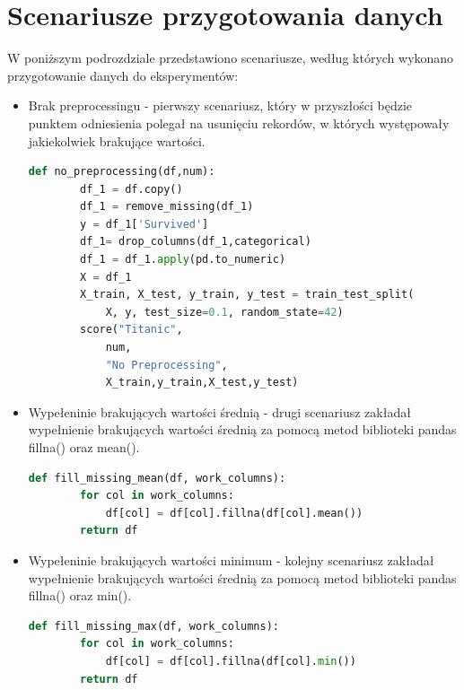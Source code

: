 \documentclass[oneside]{book}
\begin{document}
\section{Scenariusze przygotowania danych}
W poniższym podrozdziale przedstawiono scenariusze, 
według których wykonano przygotowanie danych do eksperymentów:

\begin{itemize}
\item Brak preprocessingu - pierwszy scenariusz, który w przyszłości 
będzie punktem odniesienia polegał na usunięciu rekordów, 
w których występowały jakiekolwiek brakujące wartości. 

\begin{lstlisting}[language=Python, caption={Brak przygotowania
     danych dla zbioru danych Titanic}, captionpos=b]
    def no_preprocessing(df,num):
        df_1 = df.copy()
        df_1 = remove_missing(df_1)
        y = df_1['Survived']
        df_1= drop_columns(df_1,categorical)
        df_1 = df_1.apply(pd.to_numeric)
        X = df_1
        X_train, X_test, y_train, y_test = train_test_split(
            X, y, test_size=0.1, random_state=42)
        score("Titanic",
            num,
            "No Preprocessing",
            X_train,y_train,X_test,y_test)
    \end{lstlisting}

\item Wypełeninie brakujących wartości średnią -
drugi scenariusz zakładał wypełnienie brakujących 
wartości średnią za pomocą metod biblioteki pandas 
fillna() oraz mean().

\begin{lstlisting}[language=Python, caption={Wypełnienie 
    brakujących wartości średnią}, captionpos=b]
    def fill_missing_mean(df, work_columns):
        for col in work_columns:
            df[col] = df[col].fillna(df[col].mean())
        return df
\end{lstlisting}

\item Wypełeninie brakujących wartości minimum -
kolejny scenariusz zakładał wypełnienie brakujących 
wartości średnią za pomocą metod biblioteki pandas fillna() 
oraz min().

\begin{lstlisting}[language=Python, caption={Wypełnienie 
    brakujących wartości minimum}, captionpos=b]
    def fill_missing_max(df, work_columns):
        for col in work_columns:
            df[col] = df[col].fillna(df[col].min())
        return df
\end{lstlisting}


\end{itemize}
\end{document}
